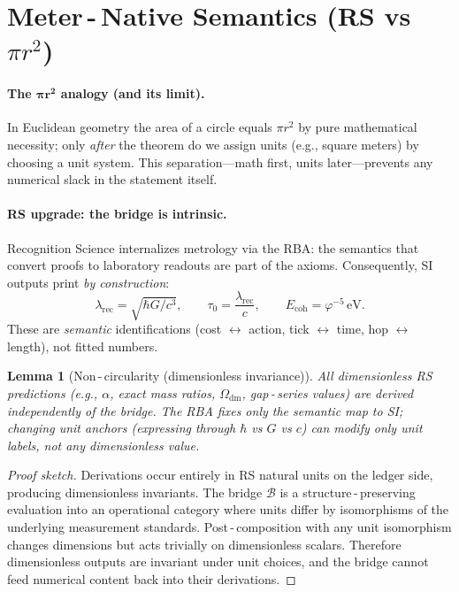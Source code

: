 \documentclass[11pt]{article}
\newcommand{\ph}{\varphi}
\newcommand{\lamrec}{\lambda_{\mathrm{rec}}}
\newcommand{\tauzero}{\tau_{0}}
\newcommand{\Ecoh}{E_{\mathrm{coh}}}
\newtheorem{lemma}[theorem]{Lemma}
\theoremstyle{remark}
\begin{document}
\section{Meter\,\mbox{-}\,Native Semantics (RS vs \texorpdfstring{$\pi r^{2}$}{pi r^2})}
\paragraph{The $\boldsymbol{\pi r^{2}}$ analogy (and its limit).}
In Euclidean geometry the area of a circle equals $\pi r^{2}$ by pure mathematical necessity; only \emph{after} the theorem do we assign units (e.g., square meters) by choosing a unit system. This separation---math first, units later---prevents any numerical slack in the statement itself.

\paragraph{RS upgrade: the bridge is intrinsic.}
Recognition Science internalizes metrology via the RBA: the semantics that convert proofs to laboratory readouts are part of the axioms. Consequently, SI outputs print \emph{by construction}:
\[
  \lamrec = \sqrt{\hbar G / c^{3}}, \qquad
  \tauzero = \frac{\lamrec}{c}, \qquad
  \Ecoh = \ph^{-5}\,\mathrm{eV}.
\]
These are \emph{semantic} identifications (cost $\leftrightarrow$ action, tick $\leftrightarrow$ time, hop $\leftrightarrow$ length), not fitted numbers.

\begin{lemma}[Non\,\mbox{-}\,circularity (dimensionless invariance)]
All dimensionless RS predictions (e.g., $\alpha$, exact mass ratios, $\Omega_{\mathrm{dm}}$, gap\,\mbox{-}\,series values) are derived independently of the bridge. The RBA fixes only the semantic map to SI; changing unit anchors (expressing through $\hbar$ vs $G$ vs $c$) can modify \emph{only} unit labels, not any dimensionless value.
\end{lemma}

\begin{proof}[Proof sketch]
Derivations occur entirely in RS natural units on the ledger side, producing dimensionless invariants. The bridge $\mathcal B$ is a structure\,\mbox{-}\,preserving evaluation into an operational category where units differ by isomorphisms of the underlying measurement standards. Post\,\mbox{-}\,composition with any unit isomorphism changes dimensions but acts trivially on dimensionless scalars. Therefore dimensionless outputs are invariant under unit choices, and the bridge cannot feed numerical content back into their derivations.
\end{proof}
\end{document}

